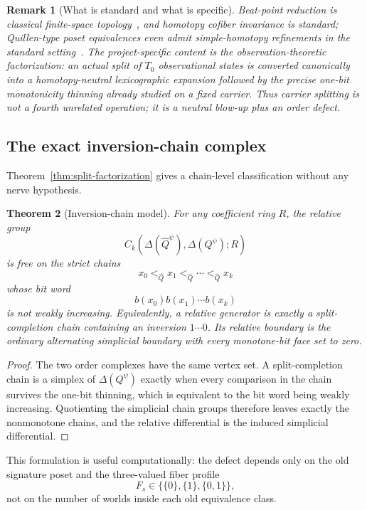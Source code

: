 \documentclass[11pt]{article}
\newtheorem{theorem}{Theorem}[section]
\newtheorem{remark}[theorem]{Remark}
\begin{document}
\begin{remark}[What is standard and what is specific]
Beat-point reduction is classical finite-space topology~\cite{Stong1966}, and homotopy cofiber
invariance is standard; Quillen-type poset equivalences even admit simple-homotopy refinements in the standard setting~\cite{Barmak2011}.  The project-specific content is the observation-theoretic
factorization: an actual split of $T_0$ observational states is converted canonically
into a homotopy-neutral lexicographic expansion followed by the precise one-bit
monotonicity thinning already studied on a fixed carrier.  Thus carrier splitting
is not a fourth unrelated operation; it is a neutral blow-up plus an order defect.
\end{remark}

\subsection{The exact inversion-chain complex}

Theorem~\ref{thm:split-factorization} gives a chain-level classification without
any nerve hypothesis.

\begin{theorem}[Inversion-chain model]\label{thm:inversion-chain}
For any coefficient ring $R$, the relative group
\[
 C_k\!\left(\Delta(\widehat Q^\psi),\Delta(Q^\psi);R\right)
\]
is free on the strict chains
\[
 x_0<_{\widehat Q}x_1<_{\widehat Q}\cdots<_{\widehat Q}x_k
\]
whose bit word
\[
 b(x_0)b(x_1)\cdots b(x_k)
\]
is not weakly increasing.  Equivalently, a relative generator is exactly a
split-completion chain containing an inversion $1\cdots0$.  Its relative boundary
is the ordinary alternating simplicial boundary with every monotone-bit face set
to zero.
\end{theorem}

\begin{proof}
The two order complexes have the same vertex set.  A split-completion chain is a
simplex of $\Delta(Q^\psi)$ exactly when every comparison in the chain survives
the one-bit thinning, which is equivalent to the bit word being weakly increasing.
Quotienting the simplicial chain groups therefore leaves exactly the nonmonotone
chains, and the relative differential is the induced simplicial differential.
\end{proof}

This formulation is useful computationally: the defect depends only on the old
signature poset and the three-valued fiber profile
\[
 F_s\in\bigl\{\{0\},\{1\},\{0,1\}\bigr\},
\]
not on the number of worlds inside each old equivalence class.
\end{document}
